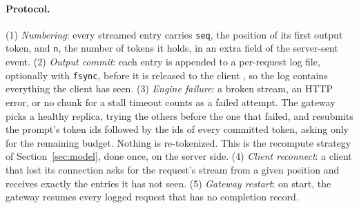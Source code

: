 \documentclass[10pt,twocolumn]{article}
\begin{document}
\paragraph{Protocol.} (1) \emph{Numbering}: every streamed entry carries
\texttt{seq}, the position of its first output token, and \texttt{n}, the
number of tokens it holds, in an extra field of the server-sent event.
(2) \emph{Output commit}: each entry is appended to a per-request log file,
optionally with \texttt{fsync}, before it is released to the client
\cite{elnozahy2002survey}, so the log contains everything the client has
seen. (3) \emph{Engine failure}: a broken stream, an HTTP error, or no chunk
for a stall timeout counts as a failed attempt. The gateway picks a healthy
replica, trying the others before the one that failed, and resubmits the
prompt's token ids followed by the ids of every committed token, asking only
for the remaining budget. Nothing is re-tokenized. This is the recompute
strategy of Section~\ref{sec:model}, done once, on the server side.
(4) \emph{Client reconnect}: a client that lost its connection asks for the
request's stream from a given position and receives exactly the entries it
has not seen. (5) \emph{Gateway restart}: on start, the gateway resumes every
logged request that has no completion record.
\end{document}
